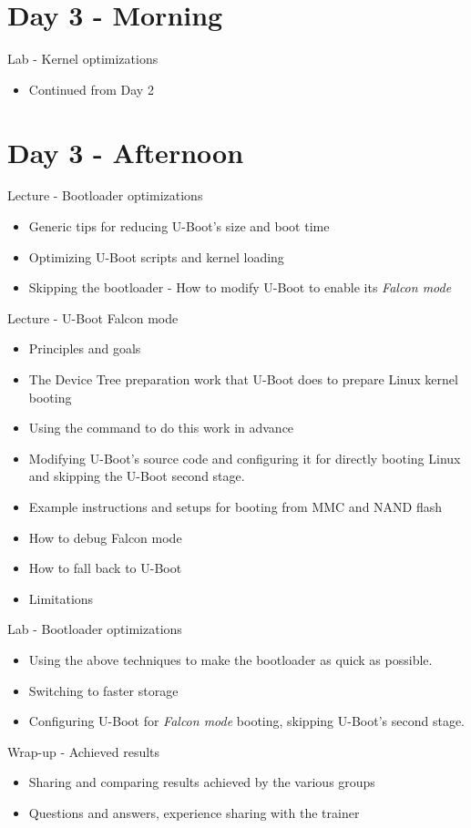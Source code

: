 \documentclass[a4paper,12pt,obeyspaces,spaces,hyphens]{article}
\begin{document}
\section{Day 3 - Morning}

\feagendaonecolumn
{Lab - Kernel optimizations}
{
 \begin{itemize}
 \item Continued from Day 2
 \end{itemize}
}

\section{Day 3 - Afternoon}

\feagendatwocolumn
{Lecture - Bootloader optimizations}
{
  \begin{itemize}
  \item Generic tips for reducing U-Boot's size and boot time
  \item Optimizing U-Boot scripts and kernel loading
  \item Skipping the bootloader - How to modify U-Boot to
        enable its {\em Falcon mode}
  \end{itemize}
}
{Lecture - U-Boot Falcon mode}
{
  \begin{itemize}
  \item Principles and goals
  \item The Device Tree preparation work that U-Boot does to prepare Linux kernel booting
  \item Using the  command to do this work in advance
  \item Modifying U-Boot's source code and configuring it for directly
        booting Linux and skipping the U-Boot second stage.
  \item Example instructions and setups for booting from MMC and NAND flash
  \item How to debug Falcon mode
  \item How to fall back to U-Boot
  \item Limitations
  \end{itemize}
}

\feagendaonecolumn
{Lab - Bootloader optimizations}
{
 \begin{itemize}
 \item Using the above techniques to make the bootloader
       as quick as possible.
 \item Switching to faster storage
 \item Configuring U-Boot for {\em Falcon mode} booting,
       skipping U-Boot's second stage.
 \end{itemize}
}

\feagendaonecolumn
{Wrap-up - Achieved results}
{
 \begin{itemize}
 \item Sharing and comparing results achieved by the various groups
 \item Questions and answers, experience sharing with the trainer
 \end{itemize}
}
\end{document}
